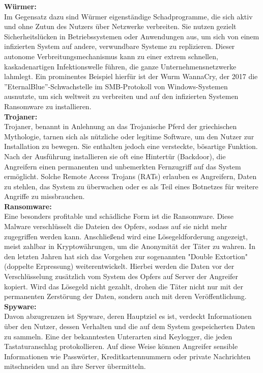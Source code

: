 \textbf{Würmer:}\\
Im Gegensatz dazu sind Würmer eigenständige Schadprogramme, die sich aktiv und ohne Zutun des Nutzers über Netzwerke verbreiten. Sie nutzen gezielt Sicherheitslücken in Betriebssystemen oder Anwendungen aus, um sich von einem infizierten System auf andere, verwundbare Systeme zu replizieren. Dieser autonome Verbreitungsmechanismus kann zu einer extrem schnellen, kaskadenartigen Infektionswelle führen, die ganze Unternehmensnetzwerke lahmlegt. Ein prominentes Beispiel hierfür ist der Wurm WannaCry, der 2017 die ''EternalBlue''-Schwachstelle im SMB-Protokoll von Windows-Systemen ausnutzte, um sich weltweit zu verbreiten und auf den infizierten Systemen Ransomware zu installieren.\cite{BSI12} \\

\textbf{Trojaner:}\\
Trojaner, benannt in Anlehnung an das Trojanische Pferd der griechischen Mythologie, tarnen sich als nützliche oder legitime Software, um den Nutzer zur Installation zu bewegen. Sie enthalten jedoch eine versteckte, bösartige Funktion. Nach der Ausführung installieren sie oft eine Hintertür (Backdoor), die Angreifern einen permanenten und unbemerkten Fernzugriff auf das System ermöglicht. Solche Remote Access Trojans (RATs) erlauben es Angreifern, Daten zu stehlen, das System zu überwachen oder es als Teil eines Botnetzes für weitere Angriffe zu missbrauchen.\cite{kasp1}\\

\textbf{Ransomware:}\\
Eine besonders profitable und schädliche Form ist die Ransomware. Diese Malware verschlüsselt die Dateien des Opfers, sodass auf sie nicht mehr zugegriffen werden kann. Anschließend wird eine Lösegeldforderung angezeigt, meist zahlbar in Kryptowährungen, um die Anonymität der Täter zu wahren. In den letzten Jahren hat sich das Vorgehen zur sogenannten "Double Extortion" (doppelte Erpressung) weiterentwickelt. Hierbei werden die Daten vor der Verschlüsselung zusätzlich vom System des Opfers auf Server der Angreifer kopiert. Wird das Lösegeld nicht gezahlt, drohen die Täter nicht nur mit der permanenten Zerstörung der Daten, sondern auch mit deren Veröffentlichung.\cite{ENISA1}\\

\textbf{Spyware:}\\
Davon abzugrenzen ist Spyware, deren Hauptziel es ist, verdeckt Informationen über den Nutzer, dessen Verhalten und die auf dem System gespeicherten Daten zu sammeln. Eine der bekanntesten Unterarten sind Keylogger, die jeden Tastaturanschlag protokollieren. Auf diese Weise können Angreifer sensible Informationen wie Passwörter, Kreditkartennummern oder private Nachrichten mitschneiden und an ihre Server übermitteln.\\

